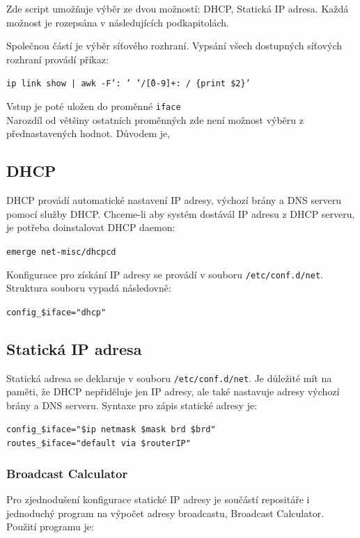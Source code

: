 \documentclass[12pt,a4paper,twoside,]{article}
\begin{document}
\hspace{-1.5em}Zde script umožňuje výběr ze dvou možností: DHCP, Statická IP adresa. Každá možnost je rozepsána v následujících podkapitolách.

\hspace{-1.5em}Společnou částí je výběr síťového rozhraní. Vypsání všech dostupných síťových rozhraní provádí příkaz:

\texttt{ip link show | awk -F': ' '/\^[0-9]+: / \{print \$2\}'}

\hspace{-1.5em}Vstup je poté uložen do proměnné \texttt{iface}\\
Narozdíl od většiny ostatních proměnných zde není možnost výběru z přednastavených hodnot. Důvodem je, %
\subsection{\textsf{DHCP}}
DHCP provádí automatické nastavení IP adresy, výchozí brány a DNS serveru pomocí služby DHCP.
Chceme-li aby systém dostávál IP adresu z DHCP serveru, je potřeba doinstalovat DHCP daemon:

\texttt{emerge net-misc/dhcpcd}

\hspace*{-1.5em}Konfigurace pro získání IP adresy se provádí v souboru \texttt{/etc/conf.d/net}. \\Struktura souboru vypadá následovně:

\texttt{config\_\$iface="dhcp"}

\subsection{\textsf{Statická IP adresa}}
Statická adresa se deklaruje v souboru \texttt{/etc/conf.d/net}. Je důležité mít na paměti, že DHCP nepřiděluje jen IP adresy, ale také nastavuje adresy výchozí brány a DNS serveru. Syntaxe pro zápis statické adresy je:

\texttt{config\_\$iface="\$ip netmask \$mask brd \$brd"}\\
\hspace*{1.5em}\texttt{routes\_\$iface="default via \$routerIP"}
\subsubsection{\textsf{Broadcast Calculator}}
Pro zjednodušení konfigurace statické IP adresy je součástí repositáře i jednoduchý program na výpočet adresy broadcastu, Broadcast Calculator. Použití programu je:
\end{document}
